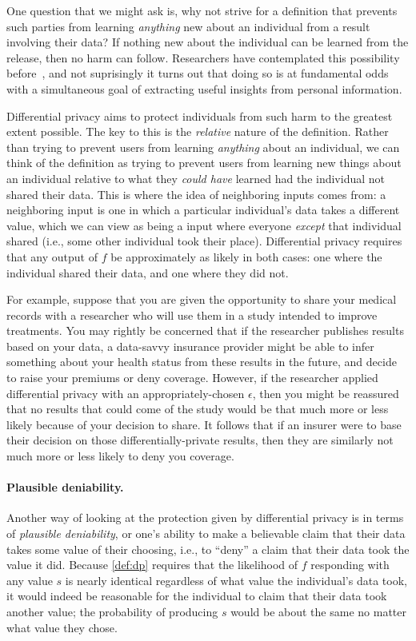 \documentclass[11pt]{article}
\begin{document}
One question that we might ask is, why not strive for a definition that prevents
such parties from learning \emph{anything} new about an individual from a result
involving their data? If nothing new about the individual can be learned from
the release, then no harm can follow. Researchers have contemplated this
possibility before~\citep{Dwork06icalp}, and not suprisingly it turns out that
doing so is at fundamental odds with a simultaneous goal of extracting useful
insights from personal information.

Differential privacy aims to protect individuals from such harm to the greatest
extent possible. The key to this is the \emph{relative} nature of the
definition. Rather than trying to prevent users from learning \emph{anything}
about an individual, we can think of the definition as trying to prevent users
from learning new things about an individual relative to what they \emph{could
  have} learned had the individual not shared their data. This is where the idea
of neighboring inputs comes from: a neighboring input is one in which a
particular individual's data takes a different value, which we can view as being
a input where everyone \emph{except} that individual shared (i.e., some other
individual took their place). Differential privacy requires that any output of
$f$ be approximately as likely in both cases: one where the individual shared
their data, and one where they did not.

For example, suppose that you are given the opportunity to share your medical
records with a researcher who will use them in a study intended to improve
treatments. You may rightly be concerned that if the researcher publishes
results based on your data, a data-savvy insurance provider might be able to
infer something about your health status from these results in the future, and
decide to raise your premiums or deny coverage. However, if the researcher
applied differential privacy with an appropriately-chosen $\epsilon$, then you
might be reassured that no results that could come of the study would be that
much more or less likely because of your decision to share. It follows that if
an insurer were to base their decision on those differentially-private results,
then they are similarly not much more or less likely to deny you coverage.

\paragraph{Plausible deniability.}
Another way of looking at the protection given by differential privacy is in
terms of \emph{plausible deniability}, or one's ability to make a believable
claim that their data takes some value of their choosing, i.e., to ``deny'' a
claim that their data took the value it did. Because \autoref{def:dp} requires
that the likelihood of $f$ responding with any value $s$ is nearly identical
regardless of what value the individual's data took, it would indeed be
reasonable for the individual to claim that their data took another value; the
probability of producing $s$ would be about the same no matter what value they
chose.
\end{document}
